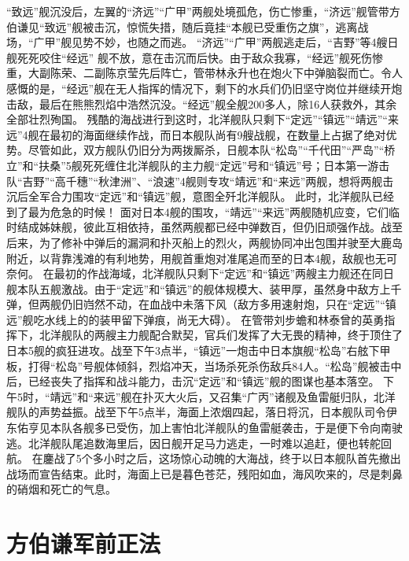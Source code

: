 \documentclass[12pt,UTF8]{ctexbook}
\begin{document}
“致远”舰沉没后，左翼的“济远”“广甲”两舰处境孤危，伤亡惨重，“济远”舰管带方伯谦见“致远”舰被击沉，惊慌失措，随后竟挂“本舰已受重伤之旗”，逃离战场，“广甲”舰见势不妙，也随之而逃。
“济远”“广甲”两舰逃走后，“吉野”等4艘日舰死死咬住“经远”
舰不放，意在击沉而后快。由于敌众我寡，“经远”舰死伤惨重，大副陈荣、二副陈京莹先后阵亡，管带林永升也在炮火下中弹脑裂而亡。令人感慨的是，“经远”舰在无人指挥的情况下，剩下的水兵们仍旧坚守岗位并继续开炮击敌，最后在熊熊烈焰中浩然沉没。“经远”舰全舰200多人，除16人获救外，其余全部壮烈殉国。
残酷的海战进行到这时，北洋舰队只剩下“定远”“镇远”“靖远”“来远”4舰在最初的海面继续作战，而日本舰队尚有9艘战舰，在数量上占据了绝对优势。尽管如此，双方舰队仍旧分为两拨厮杀，日舰本队“松岛”“千代田”“严岛”“桥立”和“扶桑”5舰死死缠住北洋舰队的主力舰“定远”号和“镇远”号；日本第一游击队“吉野”“高千穗”“秋津洲”、“浪速”4舰则专攻“靖远”和“来远”两舰，想将两舰击沉后全军合力围攻“定远”和“镇远”舰，意图全歼北洋舰队。
此时，北洋舰队已经到了最为危急的时候！
面对日本4舰的围攻，“靖远”“来远”两舰随机应变，它们临时结成姊妹舰，彼此互相依持，虽然两舰都已经中弹数百，但仍旧顽强作战。战至后来，为了修补中弹后的漏洞和扑灭船上的烈火，两舰协同冲出包围并驶至大鹿岛附近，以背靠浅滩的有利地势，用舰首重炮对准尾追而至的日本4舰，敌舰也无可奈何。
在最初的作战海域，北洋舰队只剩下“定远”和“镇远”两艘主力舰还在同日舰本队五舰激战。由于“定远”和“镇远”的舰体规模大、装甲厚，虽然身中敌方上千弹，但两舰仍旧岿然不动，在血战中未落下风（敌方多用速射炮，只在“定远”“镇远”舰吃水线上的的装甲留下弹痕，尚无大碍）。
在管带刘步蟾和林泰曾的英勇指挥下，北洋舰队的两艘主力舰配合默契，官兵们发挥了大无畏的精神，终于顶住了日本5舰的疯狂进攻。战至下午3点半，“镇远”一炮击中日本旗舰“松岛”右舷下甲板，打得“松岛”号舰体倾斜，烈焰冲天，当场杀死杀伤敌兵84人。“松岛”舰被击中后，已经丧失了指挥和战斗能力，击沉“定远”和“镇远”舰的图谋也基本落空。
下午5时，“靖远”和“来远”舰在扑灭大火后，又召集“广丙”诸舰及鱼雷艇归队，北洋舰队的声势益振。战至下午5点半，海面上浓烟四起，落日将沉，日本舰队司令伊东佑亨见本队各舰多已受伤，加上害怕北洋舰队的鱼雷艇袭击，于是便下令向南驶逃。北洋舰队尾追数海里后，因日舰开足马力逃走，一时难以追赶，便也转舵回航。
在鏖战了5个多小时之后，这场惊心动魄的大海战，终于以日本舰队首先撤出战场而宣告结束。此时，海面上已是暮色苍茫，残阳如血，海风吹来的，尽是刺鼻的硝烟和死亡的气息。

\chapter{方伯谦军前正法}
\end{document}
